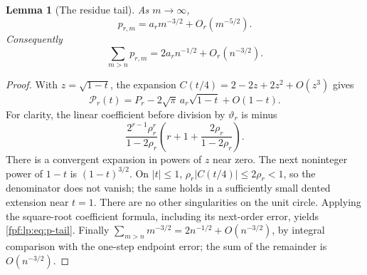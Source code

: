 \documentclass[11pt]{article}
\numberwithin{equation}{section}
\newtheorem{lemma}[theorem]{Lemma}
\theoremstyle{definition}
\begin{document}
\begin{lemma}[The residue tail]\label{fpf:lp:lem:tail}
As \(m\to\infty\),
\begin{equation}\label{fpf:lp:eq:p-tail}
 p_{r,m}=a_r m^{-3/2}+O_r(m^{-5/2}).
\end{equation}
Consequently
\begin{equation}\label{fpf:lp:eq:tail-sum}
 \sum_{m>n}p_{r,m}=2a_r n^{-1/2}+O_r(n^{-3/2}).
\end{equation}
\end{lemma}
\begin{proof}
With \(z=\sqrt{1-t}\), the expansion
\(C(t/4)=2-2z+2z^2+O(z^3)\) gives
\begin{equation}\label{fpf:lp:eq:P-local}
 \mathcal P_r(t)=P_r-2\sqrt\pi\,a_r\sqrt{1-t}+O(1-t).
\end{equation}
For clarity, the linear coefficient before division by \(\vartheta_r\) is
minus
\[
 \frac{2^{r-1}\rho_r^r}{1-2\rho_r}
 \left(r+1+\frac{2\rho_r}{1-2\rho_r}\right).
\]
There is a convergent expansion in powers of \(z\) near zero. The next
noninteger power of \(1-t\) is \((1-t)^{3/2}\). On \(|t|\le1\),
\(\rho_r|C(t/4)|\le2\rho_r<1\), so the denominator does not vanish;
the same holds in a sufficiently small dented extension near \(t=1\).
There are no other singularities on the unit circle. Applying the
square-root coefficient formula, including its next-order error, yields
\eqref{fpf:lp:eq:p-tail}. Finally
\(\sum_{m>n}m^{-3/2}=2n^{-1/2}+O(n^{-3/2})\), by integral comparison
with the one-step endpoint error; the sum of the remainder is
\(O(n^{-3/2})\).
\end{proof}
\end{document}
